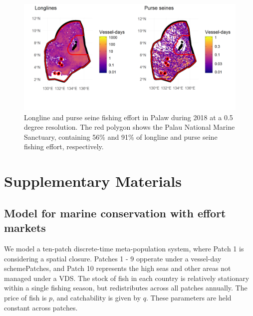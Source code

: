 \documentclass[12pt]{article}
\begin{document}
\begin{figure}
\centering
\includegraphics{img/plw_2018.png}
\caption{\label{fig:plw_2018}Longline and purse seine fishing effort in Palaw during 2018 at a 0.5 degree resolution. The red polygon shows the Palau National Marine Sanctuary, containing 56\% and 91\% of longline and purse seine fishing effort, respectively.}
\end{figure}


\clearpage

\FloatBarrier

\newcommand{\beginsupplement}{\setcounter{table}{0}  \renewcommand{\thetable}{S\arabic{table}} \setcounter{figure}{0} \renewcommand{\thefigure}{S\arabic{figure}}}

\setcounter{table}{0}  \renewcommand{\thetable}{S\arabic{table}} \setcounter{figure}{0} \renewcommand{\thefigure}{S\arabic{figure}}

\section{Supplementary Materials}

\subsection{Model for marine conservation with effort markets}

We model a ten-patch discrete-time meta-population system, where Patch 1 is considering a spatial closure. Patches 1 - 9 opperate under a vessel-day schemePatches, and Patch 10 represents the high seas and other areas not managed under a VDS. The stock of fish in each country is relatively stationary within a single fishing season, but redistributes across all patches annually. The price of fish is $p$, and catchability is given by $q$. These parameters are held constant across patches.
\end{document}
